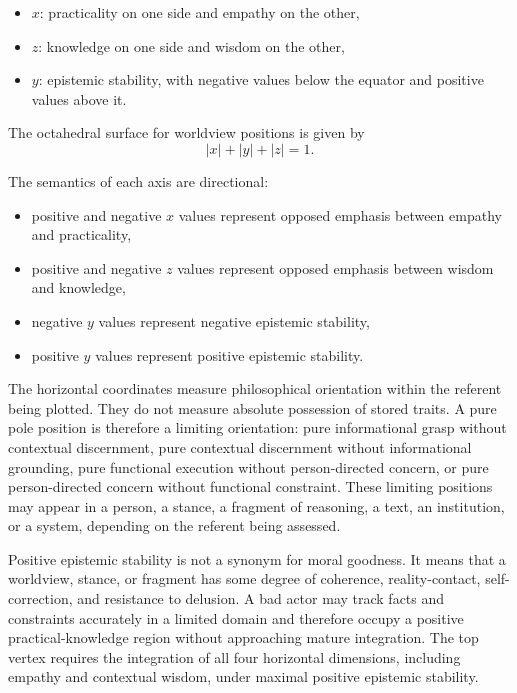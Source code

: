 \documentclass[11pt]{article}
\begin{document}
\begin{itemize}
    \item $x$: practicality on one side and empathy on the other,
    \item $z$: knowledge on one side and wisdom on the other,
    \item $y$: epistemic stability, with negative values below the equator and positive values above it.
\end{itemize}

The octahedral surface for worldview positions is given by
\[
|x| + |y| + |z| = 1.
\]

The semantics of each axis are directional:

\begin{itemize}
    \item positive and negative $x$ values represent opposed emphasis between empathy and practicality,
    \item positive and negative $z$ values represent opposed emphasis between wisdom and knowledge,
    \item negative $y$ values represent negative epistemic stability,
    \item positive $y$ values represent positive epistemic stability.
\end{itemize}

The horizontal coordinates measure philosophical orientation within the referent being plotted. They do not measure absolute possession of stored traits. A pure pole position is therefore a limiting orientation: pure informational grasp without contextual discernment, pure contextual discernment without informational grounding, pure functional execution without person-directed concern, or pure person-directed concern without functional constraint. These limiting positions may appear in a person, a stance, a fragment of reasoning, a text, an institution, or a system, depending on the referent being assessed.

Positive epistemic stability is not a synonym for moral goodness. It means that a worldview, stance, or fragment has some degree of coherence, reality-contact, self-correction, and resistance to delusion. A bad actor may track facts and constraints accurately in a limited domain and therefore occupy a positive practical-knowledge region without approaching mature integration. The top vertex requires the integration of all four horizontal dimensions, including empathy and contextual wisdom, under maximal positive epistemic stability.
\end{document}
